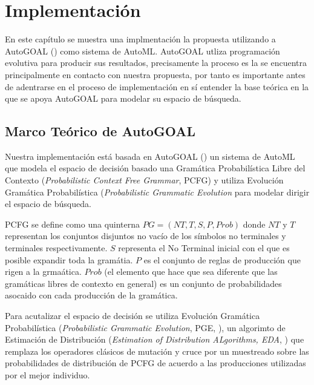 \chapter{Implementación}\label{chapter:implementation}
En este cap\'itulo se muestra una implmentaci\'on la propuesta utilizando a AutoGOAL (\cite{estevez2020solving}) como sistema de AutoML. AutoGOAL utliza programaci\'on evolutiva para producir sus resultados, precisamente la  proceso es la se encuentra principalmente en contacto con nuestra propuesta, por tanto es importante antes de adentrarse en el proceso de implementaci\'on en s\'i entender la base te\'orica en la que se apoya AutoGOAL para modelar su espacio de b\'usqueda.

\section{Marco Te\'orico de AutoGOAL}

Nuestra implementaci\'on est\'a basada en AutoGOAL (\cite{estevez2020solving}) un sistema de AutoML que modela el espacio de decisi\'on basado una Gram\'atica Probabil\'istica  Libre del Contexto (\textit{Probabilistic Context Free Grammar}, PCFG) y utiliza Evoluci\'on Gram\'atica Probabil\'istica (\textit{Probabilistic Grammatic Evolution} para modelar dirigir el espacio de b\'usqueda. 

PCFG se define como una quinterna $PG = (NT, T, S, P, Prob)$ donde $NT$ y $T$ representan los conjuntos disjuntos no vac\'io de los s\'imbolos no terminales y terminales respectivamente. $S$ representa el No Terminal inicial con el que es posible expandir toda la gram\'atia. $P$ es el conjunto de reglas de producci\'on que rigen a la grma\'atica. $Prob$ (el elemento que hace que sea diferente que las gram\'aticas libres de contexto en general) es un conjunto de probabilidades asocaido con cada producci\'on de la gram\'atica. 

Para acutalizar el espacio de decisi\'on  se utiliza Evoluci\'on Gram\'atica Probabil\'istica (\textit{Probabilistic Grammatic Evolution}, PGE, \cite{megane2021probabilistic}), un algorimto de Estimaci\'on de Distribuci\'on (\textit{Estimation of Distribution ALgorithms, EDA}, \cite{larranaga2001estimation}) que remplaza los operadores cl\'asicos de mutaci\'on y cruce por un muestreado sobre las probabilidades de distribuci\'on de PCFG de acuerdo a las producciones utilizadas por el mejor individuo. 

